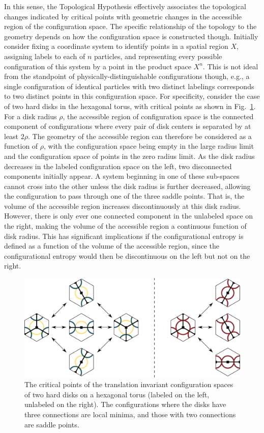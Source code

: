 \documentclass[default,iicol]{sn-jnl}%
\theoremstyle{thmstyleone}%
\theoremstyle{thmstyletwo}%
\theoremstyle{thmstylethree}%
\begin{document}
In this sense, the Topological Hypothesis effectively associates the topological changes indicated by critical points with geometric changes in the accessible region of the configuration space. The specific relationship of the topology to the geometry depends on how the configuration space is constructed though. Initially consider fixing a coordinate system to identify points in a spatial region $X$, assigning labels to each of $n$ particles, and representing every possible configuration of this system by a point in the product space $X^n$. This is not ideal from the standpoint of physically-distinguishable configurations though, e.g., a single configuration of identical particles with two distinct labelings corresponds to two distinct points in this configuration space. For specificity, consider the case of two hard disks in the hexagonal torus, with critical points as shown in Fig.\ \ref{fig:figure1}. For a disk radius $\rho$, the accessible region of configuration space is the connected component of configurations where every pair of disk centers is separated by at least $2 \rho$. The geometry of the accessible region can therefore be considered as a function of $\rho$, with the configuration space being empty in the large radius limit and the configuration space of points in the zero radius limit. As the disk radius decreases in the labeled configuration space on the left, two disconnected components initially appear. A system beginning in one of these sub-spaces cannot cross into the other unless the disk radius is further decreased, allowing the configuration to pass through one of the three saddle points. That is, the volume of the accessible region increases discontinuously at this disk radius. However, there is only ever one connected component in the unlabeled space on the right, making the volume of the accessible region a continuous function of disk radius. This has significant implications if the configurational entropy is defined as a function of the volume of the accessible region, since the configurational entropy would then be discontinuous on the left but not on the right.

\begin{figure}[h]%
	\centering
	\includegraphics[width=0.9\columnwidth]{figure1.eps}
	\caption{The critical points of the translation invariant configuration spaces of two hard disks on a hexagonal torus (labeled on the left, unlabeled on the right). The configurations where the disks have three connections are local minima, and those with two connections are saddle points.}
	\label{fig:figure1}
\end{figure}
\end{document}
